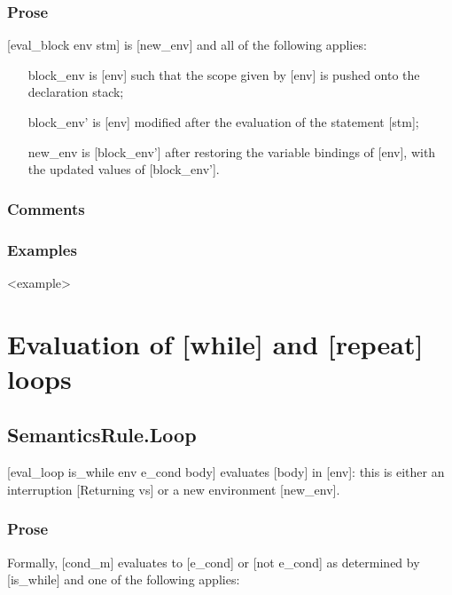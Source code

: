 \documentclass{book}
\begin{document}
    \subsection{Prose}
    [eval\_block env stm] is [new\_env] and all of the following applies:
    \begin{itemize}
    \item [block\_env] is [env] such that the scope given by [env] is pushed onto the
      declaration stack;
    \item [block\_env'] is [env] modified after the evaluation of the statement [stm];
    \item [new\_env] is [block\_env'] after restoring the variable bindings of [env],
    with the updated values of [block\_env'].
    \end{itemize}
 
    \subsection{Comments}

    \subsection{Examples}
    <example>

\chapter{Evaluation of [while] and [repeat] loops \label{chap:eval_loop}}

\section{SemanticsRule.Loop \label{sec:SemanticsRule.Loop}}
[eval\_loop is\_while env e\_cond body] evaluates [body] in [env]: this is either
an interruption [Returning vs] or a new environment [new\_env].

    \subsection{Prose}
    Formally, [cond\_m] evaluates to [e\_cond] or [not e\_cond] as determined by
    [is\_while] and one of the following applies:
\end{document}
